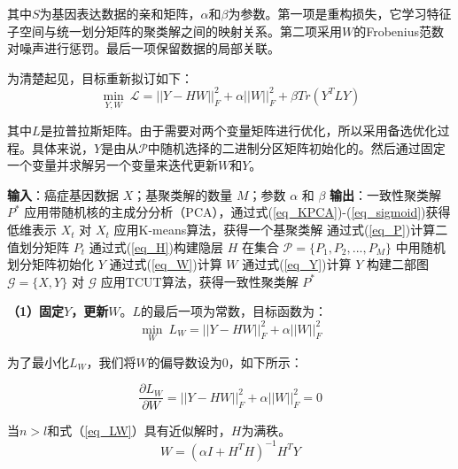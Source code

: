 \documentclass[unicode,pdfcover]{hquthesis}
\begin{document}
其中$S$为基因表达数据的亲和矩阵，$\alpha$和$\beta$为参数。第一项是重构损失，它学习特征子空间与统一划分矩阵的聚类解之间的映射关系。第二项采用$W$的Frobenius范数对噪声进行惩罚。最后一项保留数据的局部关联。

为清楚起见，目标重新拟订如下：
\begin{equation}
	\min_{Y,W}~\mathcal{L}=||Y-HW||^2_F+\alpha ||W||_F^2 + \beta Tr(Y^TLY)
\end{equation}

其中$L$是拉普拉斯矩阵。由于需要对两个变量矩阵进行优化，所以采用备选优化过程。具体来说，$Y$是由从$\mathcal{P}$中随机选择的二进制分区矩阵初始化的。然后通过固定一个变量并求解另一个变量来迭代更新$W$和$Y$。

\begin{algorithm}[t]
	\caption{面向癌症基因表达数据的混合协同集成聚类算法（HCEC）}
	\label{Alg_1}
	\begin{algorithmic}[1]
		\Require
		\textbf{输入}：癌症基因数据 $X$；基聚类解的数量 $M$；参数 $\alpha$ 和 $\beta$
		\Ensure
		\textbf{输出}：一致性聚类解 $P^*$
		\State 应用带随机核的主成分分析（PCA），通过式(\ref{eq_KPCA})-(\ref{eq_sigmoid})获得低维表示 $X_t$
		\State 对 $X_t$ 应用K-means算法，获得一个基聚类解
		\State 通过式(\ref{eq_P})计算二值划分矩阵 $P_t$
		\EndFor
		\State 通过式(\ref{eq_H})构建隐层 $H$
		\State 在集合 $\mathcal{P}=\{P_1,P_2,...,P_M\}$ 中用随机划分矩阵初始化 $Y$
		\State 通过式(\ref{eq_W})计算 $W$
		\State 通过式(\ref{eq_Y})计算 $Y$
		\EndWhile
		\State 构建二部图 $\mathcal{G}=\{X,Y\}$
		\State 对 $\mathcal{G}$ 应用TCUT算法，获得一致性聚类解 $P^*$
	\end{algorithmic}
\end{algorithm}


\textbf{（1）固定$Y$，更新$W$}。$L$的最后一项为常数，目标函数为：
\begin{equation}
	\min_{W}~L_W=||Y-HW||^2_F+\alpha ||W||_F^2
\end{equation}

为了最小化$L_W$，我们将$W$的偏导数设为0，如下所示：

\begin{equation}\label{eq_LW}
	\frac{\partial L_W}{\partial W}=||Y-HW||^2_F+\alpha ||W||_F^2=0
\end{equation}

当$n>l$和式（\ref{eq_LW}）具有近似解时，$H$为满秩。
\begin{equation}
	W=(\alpha I+H^TH)^{-1}H^TY
\end{equation}
\end{document}
